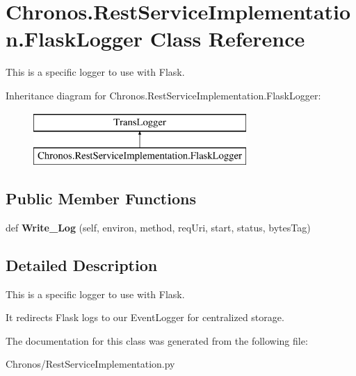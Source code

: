 \hypertarget{classChronos_1_1RestServiceImplementation_1_1FlaskLogger}{}\section{Chronos.\+Rest\+Service\+Implementation.\+Flask\+Logger Class Reference}
\label{classChronos_1_1RestServiceImplementation_1_1FlaskLogger}


This is a specific logger to use with Flask.  


Inheritance diagram for Chronos.\+Rest\+Service\+Implementation.\+Flask\+Logger\+:\begin{figure}[H]
\begin{center}
\leavevmode
\includegraphics[height=2.000000cm]{classChronos_1_1RestServiceImplementation_1_1FlaskLogger}
\end{center}
\end{figure}
\subsection*{Public Member Functions}
\begin{DoxyCompactItemize}
\item 
def {\bfseries Write\+\_\+\+Log} (self, environ, method, req\+Uri, start, status, bytes\+Tag)\hypertarget{classChronos_1_1RestServiceImplementation_1_1FlaskLogger_a64c9fd86c4d1b06a5ee86bf05531aedc}{}\label{classChronos_1_1RestServiceImplementation_1_1FlaskLogger_a64c9fd86c4d1b06a5ee86bf05531aedc}

\end{DoxyCompactItemize}


\subsection{Detailed Description}
This is a specific logger to use with Flask. 

It redirects Flask logs to our Event\+Logger for centralized storage. 

The documentation for this class was generated from the following file\+:\begin{DoxyCompactItemize}
\item 
Chronos/Rest\+Service\+Implementation.\+py\end{DoxyCompactItemize}
